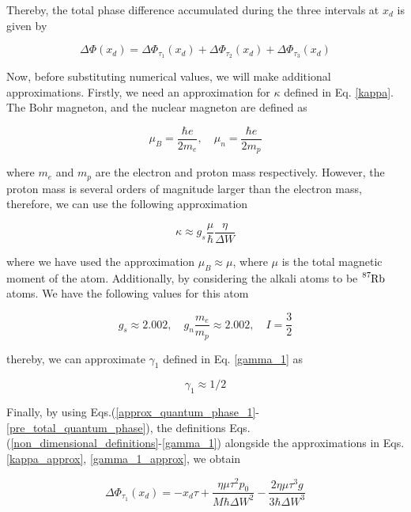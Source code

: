 \documentclass{article}
\begin{document}
Thereby, the total phase difference accumulated during the three intervals at $x_{d}$ is given by 

\begin{equation}\label{pre_total_quantum_phase}
\Delta \Phi (x_{d}) = \Delta \Phi_{\tau_{1}}(x_{d}) + \Delta \Phi_{\tau_{2}}(x_{d}) + \Delta \Phi_{\tau_{3}}(x_{d})
\end{equation}

Now, before substituting numerical values, we will make additional approximations. Firstly, we need an approximation for $\kappa$ defined in Eq. \ref{kappa}. The Bohr magneton, and the nuclear magneton are defined as

\begin{equation}
\mu_{B} = \frac{\hbar e}{2 m_{e}} \mathrm{,}\quad \mu_{n} = \frac{\hbar e}{2 m_{p}}
\end{equation}

where $m_{e}$ and $m_{p}$ are the electron and proton mass respectively. However, the proton mass is several orders of magnitude larger than the electron mass, therefore, we can use the following approximation

\begin{equation}\label{kappa_approx}
\kappa \approx g_{s}\frac{\mu }{\hbar} \frac{\eta}{\Delta W}
\end{equation}

where we have used the approximation $\mu_{B} \approx \mu$, where $\mu$ is the total magnetic moment of the atom. Additionally, by considering the alkali atoms to be $\ce{^{87}_{}Rb}$ atoms. We have the following values for this atom \cite{KAUSHALSK1970,Bunge1993}

\begin{equation}
g_{s} \approx 2.002 \mathrm{,}\quad g_{n} \frac{m_{e}}{m_{p}} \approx 2.002 \mathrm{,}\quad I = \frac{3}{2}
\end{equation}

thereby, we can approximate $\gamma_{1}$ defined in Eq. \ref{gamma_1} as

\begin{equation}\label{gamma_1_approx}
\gamma_{1} \approx 1/2
\end{equation}

Finally, by using Eqs.(\ref{approx_quantum_phase_1}-\ref{pre_total_quantum_phase}), the definitions Eqs.(\ref{non_dimensional_definitions}-\ref{gamma_1}) alongside the approximations in Eqs. \ref{kappa_approx}, \ref{gamma_1_approx}, we obtain

\begin{equation}
\Delta \Phi_{\tau_{1}}(x_{d}) = -x_{d}\tau + \frac{\eta \mu \tau^{2} p_{0}}{M \hbar \Delta W^{2}} - \frac{2 \eta \mu \tau^{3} g}{3 \hbar \Delta W^{3}}
\end{equation}
\end{document}
